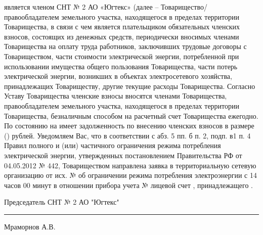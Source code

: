  является членом СНТ № 2 АО «Югтекс» (далее – Товарищество/ правообладателем земельного участка, находящегося в пределах территории Товарищества, в связи с чем является плательщиком обязательных членских взносов, состоящих из денежных средств, периодически вносимых членами Товарищества на оплату труда работников, заключивших трудовые договоры с Товариществом, части стоимости электрической энергии, потребленной при использовании имущества общего пользования Товарищества, части потерь электрической энергии, возникших в объектах электросетевого хозяйства, принадлежащих Товариществу, другие текущие расходы Товарищества. 
Согласно Уставу Товарищества членские взносы вносятся членами Товарищества, правообладателем земельного участка, находящегося в пределах территории Товарищества, безналичным способом на расчетный счет Товарищества ежегодно. 
По состоянию на    имеет задолженность по внесению членских взносов в размере   () рублей.
Уведомляем Вас, что в соответствии с абз. 5 пп. б п. 2, подп. в1 п. 4 Правил полного и (или) частичного ограничения режима потребления электрической энергии, утвержденных постановлением Правительства РФ от 04.05.2012 № 442,  Товариществом направлена заявка в территориальную сетевую организацию от    исх. №        об ограничении режима потребления электроэнергии с 14 часов 00 минут     в отношении прибора учета   №   лицевой счет , принадлежащего . 
\vspace{5mm}



\vspace{15mm}
\noindent Председатель СНТ № 2 АО "Югтекс" \hfill    \rule{3cm}{0.1 mm}    Мраморнов А.В.